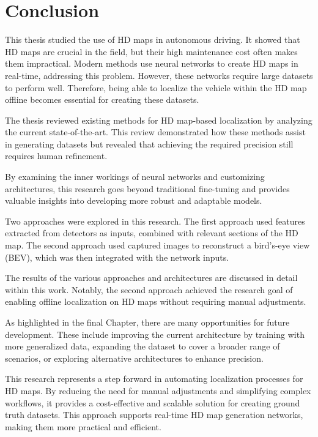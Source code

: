 \chapter*{Conclusion}

This thesis studied the use of HD maps in autonomous driving. It showed that HD maps are crucial in the field, but their high maintenance cost often makes them impractical. Modern methods use neural networks to create HD maps in real-time, addressing this problem. However, these networks require large datasets to perform well. Therefore, being able to localize the vehicle within the HD map offline becomes essential for creating these datasets.

The thesis reviewed existing methods for HD map-based localization by analyzing the current state-of-the-art. This review demonstrated how these methods assist in generating datasets but revealed that achieving the required precision still requires human refinement.

By examining the inner workings of neural networks and customizing architectures, this research goes beyond traditional fine-tuning and provides valuable insights into developing more robust and adaptable models.

Two approaches were explored in this research.
The first approach used features extracted from detectors as inputs, combined with relevant sections of the HD map.
The second approach used captured images to reconstruct a bird's-eye view (BEV), which was then integrated with the network inputs.

The results of the various approaches and architectures are discussed in detail within this work. Notably, the second approach achieved the research goal of enabling offline localization on HD maps without requiring manual adjustments.

As highlighted in the final Chapter, there are many opportunities for future development. These include improving the current architecture by training with more generalized data, expanding the dataset to cover a broader range of scenarios, or exploring alternative architectures to enhance precision.

This research represents a step forward in automating localization processes for HD maps. By reducing the need for manual adjustments and simplifying complex workflows, it provides a cost-effective and scalable solution for creating ground truth datasets. This approach supports real-time HD map generation networks, making them more practical and efficient.